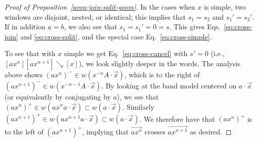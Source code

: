 \documentclass[10pt,a4paper]{amsart}
\newcommand{\ora}[1]{\overrightarrow{#1}}
\newcommand{\reducesto}{\mathrel{\searrow}}
\begin{document}
\begin{proof}[Proof of Proposition~\ref{prop:join-split-geom}]
  In the cases when $x$ is simple, two windows are disjoint, nested,
  or identical; this implies that $s_1 = s_2$ and $s_1' = s_2'$.
  If in
  addition $a=b$, we also see that $s_1=s_1'=0=s$. This gives Eqs.\
  \eqref{eq:cross-join} and \eqref{eq:cross-split}, and the special
  case Eq.\ \eqref{eq:cross-simple}.

  To see that with $x$ simple we get Eq.\ \eqref{eq:cross-cancel} with
  $s'=0$ (i.e., $[ax^n][ax^{n+1}] \reducesto [x]$), we look slightly deeper
  in the words. The analysis above shows $(ax^n)^- \in
  w(x^{-n}A\cdot\ora{x})$, which is to the right of
  $(ax^{n+1})^- \in w(x^{-n-1}A\cdot\ora{x})$. By
  looking at the band model centered on $a \cdot \ora{x}$ (or
  equivalently by conjugating by $a$), we see that
  $(ax^n)^+ \in w(ax^na\cdot\ora{x}) \subset w(a\cdot\ora{x})$. Similarly
  $(ax^{n+1})^+ \in w(ax^{n+1}a\cdot\ora{x}) \subset
  w(a\cdot\ora{x})$. We therefore have that $(ax^n)^+$ is to the left
  of $(ax^{n+1})^+$, implying that $\ora{ax^n}$ crosses $\ora{ax^{n+1}}$ as
  desired.
\end{proof}
\end{document}
